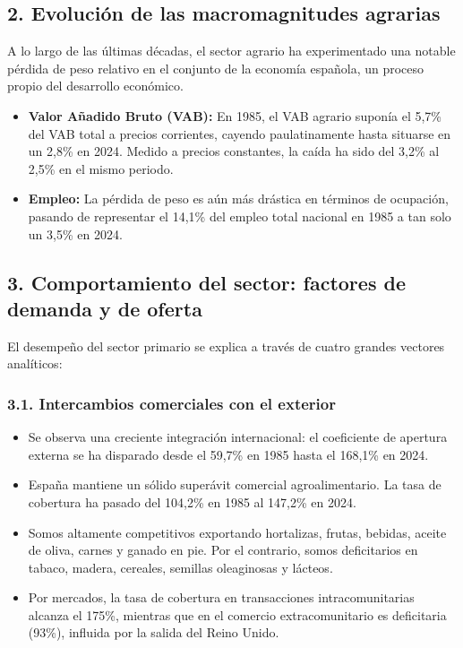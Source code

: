 \subsection*{2. Evolución de las macromagnitudes agrarias}

A lo largo de las últimas décadas, el sector agrario ha experimentado una notable pérdida de peso relativo en el conjunto de la economía española, un proceso propio del desarrollo económico.

\begin{itemize}
  \item \textbf{Valor Añadido Bruto (VAB):} En 1985, el VAB agrario suponía el 5,7\% del VAB total a precios corrientes, cayendo paulatinamente hasta situarse en un 2,8\% en 2024. Medido a precios constantes, la caída ha sido del 3,2\% al 2,5\% en el mismo periodo.
  \item \textbf{Empleo:} La pérdida de peso es aún más drástica en términos de ocupación, pasando de representar el 14,1\% del empleo total nacional en 1985 a tan solo un 3,5\% en 2024.
\end{itemize}

\subsection*{3. Comportamiento del sector: factores de demanda y de oferta}

El desempeño del sector primario se explica a través de cuatro grandes vectores analíticos:

\subsubsection*{3.1. Intercambios comerciales con el exterior}

\begin{itemize}
  \item Se observa una creciente integración internacional: el coeficiente de apertura externa se ha disparado desde el 59,7\% en 1985 hasta el 168,1\% en 2024.
  \item España mantiene un sólido superávit comercial agroalimentario. La tasa de cobertura ha pasado del 104,2\% en 1985 al 147,2\% en 2024.
  \item Somos altamente competitivos exportando hortalizas, frutas, bebidas, aceite de oliva, carnes y ganado en pie. Por el contrario, somos deficitarios en tabaco, madera, cereales, semillas oleaginosas y lácteos.
  \item Por mercados, la tasa de cobertura en transacciones intracomunitarias alcanza el 175\%, mientras que en el comercio extracomunitario es deficitaria (93\%), influida por la salida del Reino Unido.
\end{itemize}

